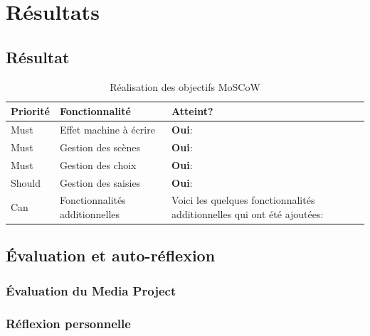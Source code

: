 \section{Résultats} \label{chap:resultats}

\subsection{Résultat}


\begin{table}[htbp]
    \centering
    \caption{Réalisation des objectifs MoSCoW}
    \renewcommand{\arraystretch}{1.5}
    \begin{tabular}{p{1.7cm} p{4cm} p{7cm}}
        \hline
        \textbf{Priorité} & \textbf{Fonctionnalité} & \textbf{Atteint?} \\
        \hline
        Must & Effet machine à écrire & \textbf{Oui}: \\
        \addlinespace
        Must & Gestion des scènes & \textbf{Oui}: \\
        \addlinespace
        Must & Gestion des choix & \textbf{Oui}: \\
        \addlinespace
        Should & Gestion des saisies & \textbf{Oui}: \\
        \addlinespace
        Can & Fonctionnalités additionnelles & Voici les quelques fonctionnalités additionnelles qui ont été ajoutées:  \\
        \hline
    \end{tabular}
    \label{tab:resultats_moscow}
\end{table}



\subsection{Évaluation et auto-réflexion}

\subsubsection{Évaluation du Media Project}



\subsubsection{Réflexion personnelle}

